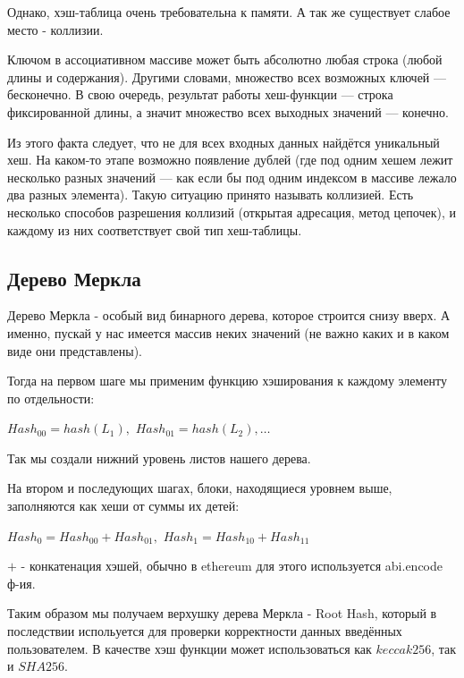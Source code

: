 \documentclass[utf8,14pt,a4paper,oneside,russian]{book}
\begin{document}
	Однако, хэш-таблица очень требовательна к памяти. А так же существует слабое место - коллизии.
	
	Ключом в ассоциативном массиве может быть абсолютно любая строка (любой длины и содержания). Другими словами, множество всех возможных ключей — бесконечно. В свою очередь, результат работы хеш-функции — строка фиксированной длины, а значит множество всех выходных значений — конечно.
	
	Из этого факта следует, что не для всех входных данных найдётся уникальный хеш. На каком-то этапе возможно появление дублей (где под одним хешем лежит несколько разных значений — как если бы под одним индексом в массиве лежало два разных элемента). Такую ситуацию принято называть коллизией. Есть несколько способов разрешения коллизий (открытая адресация, метод цепочек), и каждому из них соответствует свой тип хеш-таблицы.
	
	\newpage
	\subsection{Дерево Меркла}
	
	Дерево Меркла - особый вид бинарного дерева, которое строится снизу вверх. А именно, пускай у нас имеется массив неких значений (не важно каких и в каком виде они представлены).
	
	Тогда на первом шаге мы применим функцию хэширования к каждому элементу по отдельности:
	
	
	\begin{center}
		$Hash_{00}=hash(L_1),$ $Hash_{01}=hash(L_2),\dots$\\
	\end{center}

	Так мы создали нижний уровень листов нашего дерева.
	
	На втором и последующих шагах, блоки, находящиеся уровнем выше, заполняются как хеши от суммы их детей:
	
	\begin{center}
		$Hash_{0}=Hash_{00}+Hash_{01},$ $Hash_{1}=Hash_{10}+Hash_{11}$\\
	\end{center}

	$+$ - конкатенация хэшей, обычно в ethereum для этого используется abi.encode ф-ия.
	
	Таким образом мы получаем верхушку дерева Меркла - Root Hash, который в последствии испольуется для проверки корректности данных введённых пользователем. В качестве хэш функции может использоваться как $keccak256$, так и $SHA256$.
	
\end{document}
